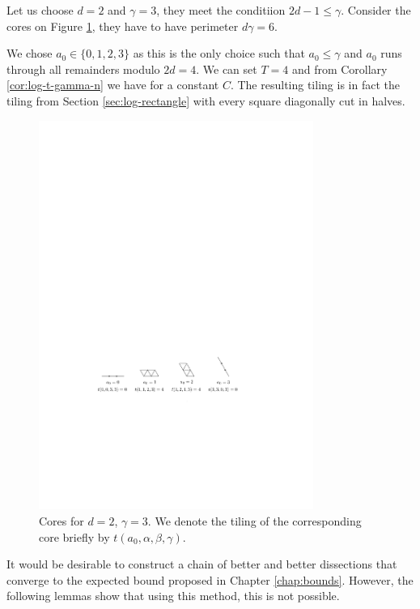\begin{exmp}
Let us choose $d=2$ and $\gamma=3$, they meet the conditiion $2d-1 \leq \gamma$. Consider the cores on Figure \ref{fig:core-kk3}, they have to have perimeter $d\gamma = 6$.

We chose $a_0 \in \{0,1,2,3\}$ as this is the only choice such that $a_0 \leq \gamma$ and $a_0$ runs through all remainders modulo $2d=4$. We can set $T=4$ and from Corollary \ref{cor:log-t-gamma-n} we have
%
for a constant $C$. The resulting tiling is in fact the tiling from Section \ref{sec:log-rectangle}  with every square diagonally cut in halves.

\begin{figure}[htb]
\centering
\includegraphics[width=0.8\textwidth]{img/example_core_kk3.pdf}
\caption{Cores for $d=2$, $\gamma=3$. We denote the tiling of the corresponding core briefly by $t(a_0,\alpha,\beta,\gamma)$.}
\label{fig:core-kk3}
\end{figure}
\end{exmp}%

It would be desirable to construct a chain of better and better dissections that converge to the expected bound proposed in Chapter \ref{chap:bounds}. However, the following lemmas show that using this method, this is not possible.

